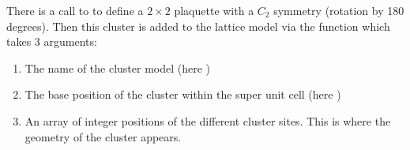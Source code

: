 \documentclass[letterpaper,10pt,english]{sphinxmanual}
\begin{document}
\begin{sphinxVerbatim}[commandchars=\\\{\}]
 \PYG{p}{[}  \PYG{p}{]} 
 \PYG{p}{[}  \PYG{p}{]} 
 \PYG{p}{[}  \PYG{p}{]} 
  \PYG{p}{[}  \PYG{p}{]}
\end{sphinxVerbatim}

\sphinxAtStartPar
There is a call to  to define a \(2\times2\) plaquette with a \(C_2\) symmetry (rotation by 180 degrees). Then this cluster is added to the lattice model via the function  which takes 3 arguments:
\begin{enumerate}
%
\item {} 
\sphinxAtStartPar
The name of the cluster model (here )

\item {} 
\sphinxAtStartPar
The base position of the cluster within the super unit cell (here \sphinxcode{\sphinxupquote{{[}0,0,0{]}}})

\item {} 
\sphinxAtStartPar
An array of integer positions of the different cluster sites. This is where the geometry of the cluster appears.

\end{enumerate}
\end{document}
